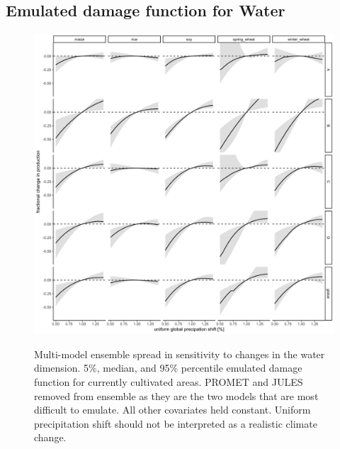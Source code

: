 \documentclass[10pt]{article}
\begin{document}
\subsection{Emulated damage function for Water}
\begin{figure}[h!]
\includegraphics[width=\textwidth]{s_water.png}\\
\caption{Multi-model ensemble spread in sensitivity to changes in the water dimension. 5\%, median,  and 95\% percentile emulated damage function for currently cultivated areas. PROMET and JULES removed from ensemble as they are the two models that are most difficult to emulate. All other covariates held constant. Uniform precipitation shift should not be interpreted as a realistic climate change.}
\label{fig:water}
\end{figure}
\clearpage
\end{document}
